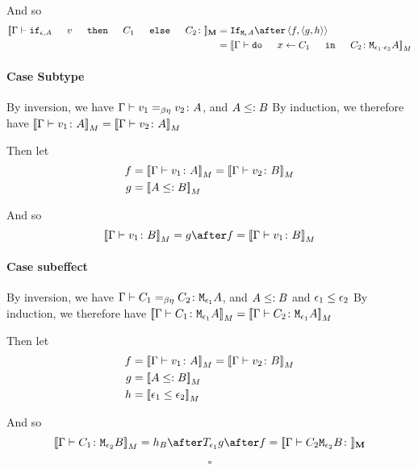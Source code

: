 \documentclass{report}
\begin{document}
    And so
    \begin{equation}
        \begin{split}
            \deno{\gtyperelation{\ifthenelse{\e}{A}{v}{C_1}{C_2}}} & = \ifnt{\mea}\after \pr{f}{\pr{g}{h}}\\
             & = \deno{\gtyperelation{\doin{x}{C_1}{C_2}}{\M{\e_1\dot\e_2}{A}}}
        \end{split}
    \end{equation}
    \paragraph{Case Subtype}
    By inversion, we have $\Gamma \vdash v_1 =_{\beta\eta} v_2 \colon A$, and $A \leq: B$ 
    By induction, we therefore have ${\bf [\![}\Gamma \vdash v_1 \colon A{\bf ]\!]}_M = {\bf [\![}\Gamma \vdash v_2 \colon A{\bf ]\!]}_M$

    Then let
    \begin{align}
        f &{}={\bf [\![}\Gamma \vdash v_1 \colon A{\bf ]\!]}_M = {\bf [\![}\Gamma \vdash v_2 \colon B{\bf ]\!]}_M\\
        g &{}={\bf [\![}A \leq: B{\bf ]\!]}_M
    \end{align}



    And so
    \begin{equation}
            \deno{\gtyperelation{v_1}{B}} = g \after f = \deno{\gtyperelation{v_1}{B}}
    \end{equation}
    \paragraph{Case subeffect}
    By inversion, we have $\Gamma \vdash C_1 =_{\beta\eta} C_2 \colon \texttt{M}_{\epsilon_1}{A}$, and $A \leq: B$ and $\epsilon_1 \leq \epsilon_2$
    By induction, we therefore have ${\bf [\![}\Gamma \vdash C_1 \colon \texttt{M}_{\epsilon_1}{A}{\bf ]\!]}_M = {\bf [\![}\Gamma \vdash C_2 \colon \texttt{M}_{\epsilon_1}{A}{\bf ]\!]}_M$

    Then let
    \begin{align}
        f &{}=\deno{\gtyperelation{v_1}{A}} = \deno{\gtyperelation{v_2}{B}}\\
        g &{}=\deno{A \subtype B}\\
        h &{}=\deno{\e_1\subeffect\e_2}
    \end{align}

    And so
    \begin{equation}
            \deno{\gtyperelation{C_1}{\M{\e_2}{B}}} = h_B \after \T{\e_1}{g} \after f = \deno{\gtyperelation{C_2{\M{\e_2}{B}}}}
    \end{equation}

    $$\square$$
\end{document}
